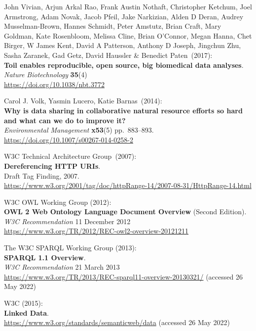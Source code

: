 \begin{thebibliography}{9}
John Vivian, Arjun Arkal Rao, Frank Austin Nothaft, Christopher
Ketchum, Joel Armstrong, Adam Novak, Jacob Pfeil, Jake Narkizian, Alden
D Deran, Audrey Musselman-Brown, Hannes Schmidt, Peter Amstutz, Brian
Craft, Mary Goldman, Kate Rosenbloom, Melissa Cline, Brian O'Connor,
Megan Hanna, Chet Birger, W James Kent, David A Patterson, Anthony D
Joseph, Jingchun Zhu, Sasha Zaranek, Gad Getz, David Haussler \&
Benedict Paten~(2017):\\
\textbf{Toil enables reproducible, open source, big biomedical data
analyses}.\\
\emph{Nature Biotechnology} \textbf{35}(4)\\
\url{https://doi.org/10.1038/nbt.3772}

Carol J. Volk, Yasmin Lucero, Katie Barnas~(2014):\\
\textbf{Why is data sharing in collaborative natural resource efforts so
hard and what can we do to improve it?}\\
\emph{Environmental Management} \textbf{x53}(5) pp.~883--893.\\
\url{https://doi.org/10.1007/s00267-014-0258-2}

W3C Technical Architecture Group~(2007):\\
\textbf{Dereferencing HTTP URIs}.\\
Draft Tag Finding, 2007.\\
\url{https://www.w3.org/2001/tag/doc/httpRange-14/2007-08-31/HttpRange-14.html}

W3C OWL Working Group (2012): \\
\textbf{{OWL} 2 {Web Ontology Language Document Overview}} ({Second Edition}). \\
\emph{W3C Recommendation} 11 December 2012 \\
\url{https://www.w3.org/TR/2012/REC-owl2-overview-20121211} 

The W3C SPARQL Working Group (2013):\\
\textbf{{SPARQL} 1.1 {Overview}}. \\
\emph{W3C Recommendation} 21 March 2013 \\
\url{https://www.w3.org/TR/2013/REC-sparql11-overview-20130321/} (accessed 26 May 2022)

W3C (2015): \\
\textbf{Linked Data}.\\
\url{https://www.w3.org/standards/semanticweb/data} (accessed 26 May 2022)


\end{thebibliography}
